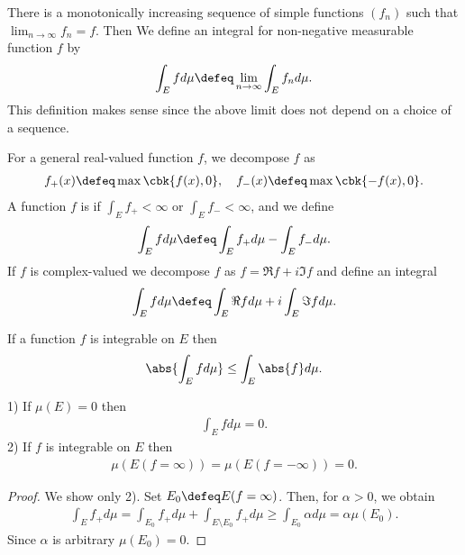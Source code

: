 \documentclass[openany, a4paper, oneside]{jsbook}
\begin{document}
\begin{defn}
 There is a monotonically increasing sequence of simple functions $(f_n)$ such that $\lim_{n \to \infty} f_n = f$.
 Then  We define an integral for non-negative measurable function $f$ by
 \begin{align}
  \int_E f d \mu
  \defeq
  \lim_{n \to \infty} \int_E f_n d \mu.
 \end{align}
 This definition makes sense since the above limit does not depend on a choice of a sequence.

 For a general real-valued function $f$, we decompose $f$ as
 \begin{align}
  f_+ (x)
  \defeq
  \max \cbk{f (x), 0}, \quad
  f_- (x)
  \defeq
  \max \cbk{- f (x), 0}.
 \end{align}
 A function $f$ is  if $\int_E f_+ < \infty$ or $\int_E f_- < \infty$, and we define
 \begin{align}
  \int_E f d \mu
  \defeq
  \int_E f_+ d \mu - \int_E f_- d \mu.
 \end{align}
 If $f$ is complex-valued we decompose $f$ as $f = \Re f + i \Im f$ and define an integral
 \begin{align}
  \int_E f d\mu
  \defeq
  \int_E \Re f d \mu + i \int_E \Im f d \mu.
 \end{align}
\end{defn}
\begin{thm}
 If a function $f$ is integrable on $E$ then
 \begin{align}
  \abs{\int_E f d\mu}
  \leq
  \int_E \abs{f} d\mu.
 \end{align}
\end{thm}
\begin{thm}
 1) If $\mu (E) = 0$ then
    \begin{align}
     \int_E f d \mu = 0.
    \end{align}
 2) If $f$ is integrable on $E$ then
    \begin{align}
     \mu (E (f = \infty)) = \mu (E (f = - \infty)) = 0.
    \end{align}
\end{thm}
\begin{proof}
We show only 2).
Set $E_0 \defeq E (f = \infty)$.
Then, for $\alpha > 0$, we obtain
\begin{align}
 \int_E f_+ d \mu
 =
 \int_{E_0} f_+ d \mu + \int_{E \setminus E_0} f_+ d \mu
 \geq
 \int_{E_0} \alpha d \mu
 =
 \alpha \mu (E_0).
\end{align}
Since $\alpha$ is arbitrary $\mu (E_0) = 0$.
\end{proof}
\end{document}
